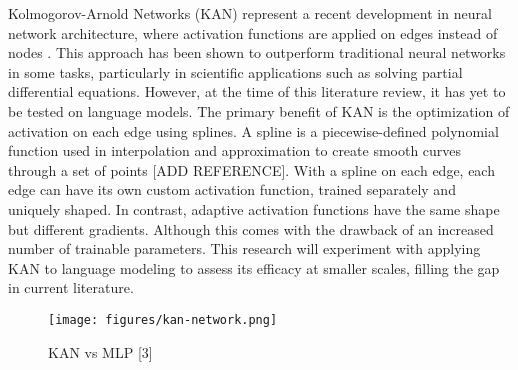 Kolmogorov-Arnold Networks (KAN) represent a recent development in neural network architecture, where activation functions are applied on edges instead of nodes \cite{Liu2024}. This approach has been shown to outperform traditional neural networks in some tasks, particularly in scientific applications such as solving partial differential equations. However, at the time of this literature review, it has yet to be tested on language models. The primary benefit of KAN is the optimization of activation on each edge using splines. A spline is a piecewise-defined polynomial function used in interpolation and approximation to create smooth curves through a set of points [ADD REFERENCE]. With a spline on each edge, each edge can have its own custom activation function, trained separately and uniquely shaped. In contrast, adaptive activation functions have the same shape but different gradients. Although this comes with the drawback of an increased number of trainable parameters. This research will experiment with applying KAN to language modeling to assess its efficacy at smaller scales, filling the gap in current literature.
\clearpage
\vspace*{\fill}
\begin{figure}[hb]
    \centering
    \texttt{[image: figures/kan-network.png]}
    \caption{KAN vs MLP [3]}
    \label{fig:your-label}
\end{figure}
\vspace*{\fill}

\clearpage